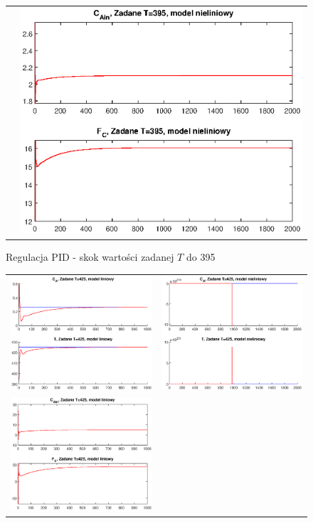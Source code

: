 \begin{figure}
\begin{tabular}{cc}
	&
	\includegraphics[width=.5\linewidth]{img/pidnlin/pidnlin5.eps}
\end{tabular}
\label{ch2:pid3}
\caption{Regulacja PID - skok wartości zadanej $T$ do 395}
\end{figure}
\newpage
\begin{figure}
\begin{tabular}{cc}
	\includegraphics[width=.5\linewidth]{img/pidlin/pidlin8.eps}
	&
	\includegraphics[width=.5\linewidth]{img/pidnlin/pidnlin8.eps}
	\\
	\includegraphics[width=.5\linewidth]{img/pidlin/pidlin7.eps}

\end{tabular}
\end{figure}
